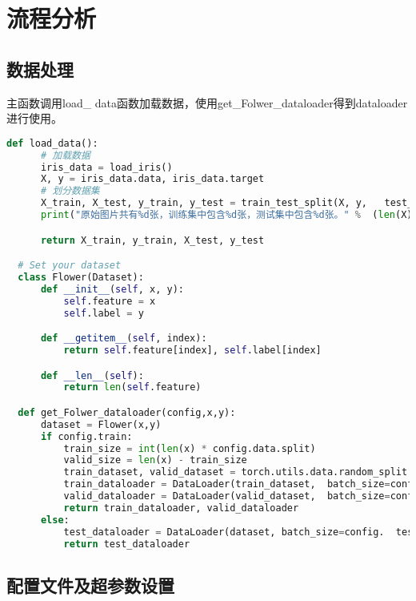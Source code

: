 \documentclass[lang=cn,a4paper]{elegantpaper}
\begin{document}
\section{流程分析}


\subsection{数据处理}

主函数调用load\_ data函数加载数据，使用get\_Folwer\_dataloader得到dataloader进行使用。

\begin{lstlisting}[language = python]
  def load_data():
      # 加载数据
      iris_data = load_iris()
      X, y = iris_data.data, iris_data.target
      # 划分数据集
      X_train, X_test, y_train, y_test = train_test_split(X, y,   test_size=0.2, random_state=42)
      print("原始图片共有%d张，训练集中包含%d张，测试集中包含%d张。" %  (len(X), len(X_train), len(X_test)))

      return X_train, y_train, X_test, y_test

  # Set your dataset
  class Flower(Dataset):
      def __init__(self, x, y):
          self.feature = x
          self.label = y

      def __getitem__(self, index):
          return self.feature[index], self.label[index]

      def __len__(self):
          return len(self.feature)

  def get_Folwer_dataloader(config,x,y):
      dataset = Flower(x,y)
      if config.train:
          train_size = int(len(x) * config.data.split)
          valid_size = len(x) - train_size
          train_dataset, valid_dataset = torch.utils.data.random_split  (dataset, [train_size, valid_size])
          train_dataloader = DataLoader(train_dataset,  batch_size=config.train_batch_size, shuffle = True,  num_workers=8,drop_last=False)
          valid_dataloader = DataLoader(valid_dataset,  batch_size=config.valid_batch_size, shuffle = True,  num_workers=8,drop_last=False)
          return train_dataloader, valid_dataloader
      else:
          test_dataloader = DataLoader(dataset, batch_size=config.  test_batch_size, shuffle=True, num_workers=8)
          return test_dataloader
\end{lstlisting}





\subsection{配置文件及超参数设置}
\end{document}
